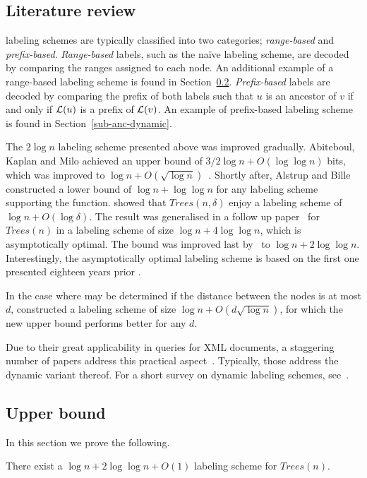 			
\subsection{Literature review}\label{sec:anc-lit}
	\ancestry  labeling schemes are typically classified into two categories; \emph{range-based} and \emph{prefix-based}.
	  \emph{Range-based} labels, such as the na\"ive labeling scheme, are decoded by  comparing the  ranges assigned to each node. An additional example of a range-based  labeling scheme is found in Section~\ref{subsetion:mat-optimal}.
	 \emph{Prefix-based} labels are decoded by comparing the prefix of both labels such that $u$ is an ancestor of $v$ if and only if $ \mathcal{L}(u)$ is  a prefix of $ \mathcal{L}(v)$.
	 An example of prefix-based labeling scheme is found in Section~\ref{sub-anc-dynamic}.
	  
	The $2\log n$ labeling  scheme presented above was improved gradually.
	 Abiteboul, Kaplan and Milo  achieved an upper bound of  $3/2 \log n +O(\log \log n)$ bits, which was improved  to $\log n + O(\sqrt{\log n})$~\cite{Alstrup06}.
	 Shortly after,  Alstrup and Bille  constructed a lower bound of $ \log n + \log \log n$ for any labeling scheme supporting the function.
	 showed that $Trees(n, \delta)$ enjoy a labeling scheme of $ \log n+ O(\log \delta)$.
	The result was  generalised in a follow up paper~\cite{Korman10} for $Trees(n)$ in a labeling scheme of size $\log n+ 4 \log \log n $, which is asymptotically optimal. The bound was improved last by~ to $\log n + 2 \log \log n$.
	 Interestingly, the asymptotically optimal  labeling scheme  is based on  the first one presented eighteen years prior \cite{Kannan92}.
	
	In the case where \ancestry may be determined if the distance between the nodes is at most $d$,  constructed a labeling scheme
	 of size $\log n + O( d \sqrt{ \log n})$, for which the new upper bound performs better for any $d$.
	 
	 Due to their great applicability in queries for XML documents, a staggering number of papers address this practical aspect~\cite{kaplan2002comparison,wu2004prime,o2004ordpaths,li2005qed,lu2005region,harder2007node,harder2007node,xu2009dde,cohen2010labeling,o2012scooter,ghaleb2013novel}.
	 Typically, those address the dynamic variant thereof.  For a short survey on  dynamic \ancestry labeling schemes, see~\cite{cohen2010labeling}.
	 
\subsection{Upper bound} \label{subsetion:mat-optimal}
In this section we prove the following.
  \begin{theorem}
  There exist a $\log n + 2\log \log n + O(1)$ \ancestry labeling scheme for $Trees(n)$.
  \end{theorem}
  
